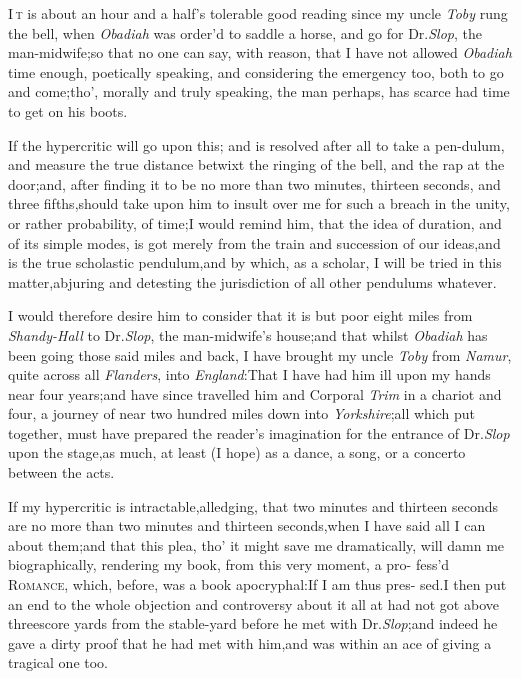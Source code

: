 \documentclass{article}
\begin{document}
\lettrine{I}{\,t} is about an hour and a
half’s tolerable good reading since my uncle \textit{Toby} rung
the bell, when \textit{Obadiah} was order’d to saddle a horse, and go
for Dr.\@ \textit{Slop}, the man-midwife;\tsk so that no one can say,
with reason, that I have not allowed \textit{Obadiah} time enough,
poetically speaking, and considering the emergen\-cy too, both to go
and come;\tsh tho’, morally and truly speaking, the
man perhaps, has scarce had time to get on\break
his boots.

If the hypercritic will go upon this; and is resolved after all
to take a pen-\pb dulum, and measure the true distance betwixt the
ringing of the bell, and the rap at the door;\tsk and, after
finding it to be no more than two minutes, thirteen seconds, and
three fifths,\tsk should take upon him to insult over me for such
a breach in the unity, or rather probability, of time;\tsk I would
remind him, that the idea of duration, and of its simple modes, is
got merely from the train and succession of our
ideas,\tsk and is the true scholastic
pendulum,\tsh and by which, as a scholar, I will be tried
in this matter,\tsk\break abjuring and detesting the jurisdiction of
all other pendulums whatever.

I would therefore desire him to consider that it is but poor
eight miles from \textit{Shandy-Hall} to Dr.\@ \textit{Slop}, the
man-mid\-wife’s house;\tsk and that whilst \textit{Obadiah} has
been going those said miles and back,\pb
I have brought my uncle
\textit{Toby} from \textit{Namur}, quite across all \textit{Flanders}, into
\textit{England}:\tsk That I have had him ill upon my hands near
four years;\tsk and have since travelled him and Corporal
\textit{Trim} in a chariot and four, a journey of near two hundred
miles down into \textit{Yorkshire};\tsk all which put together,
must have prepared the reader’s imagination for the entrance
of Dr.\@ \textit{Slop} upon the stage,\tsk as much, at least (I hope)
as a dance, a song, or a concerto between the acts.

If my hypercritic is intractable,\tsk al\-ledging, that two minutes
and thirteen seconds are no more than two minutes and thirteen
seconds,\tsk when I have said all I can about them;\tsk and that this
plea, tho’ it might save me dramatically, will damn me
biographically, rendering my book, from this very moment, a
pro-\pb
fess’d \textsc{Romance}, which, before, was a book
apocryphal:\tsk If I am thus pres-\break
sed.\tsk I then put an
end to the whole objection and controversy about it all
at\break
{}
had not got above threescore yards from the stable-yard before he met
with Dr.\@ \textit{Slop};\tsk and indeed he gave a dirty
proof that he had met with him,\tsk and was within an ace of giving a
tragical one\break
too.  
\end{document}
